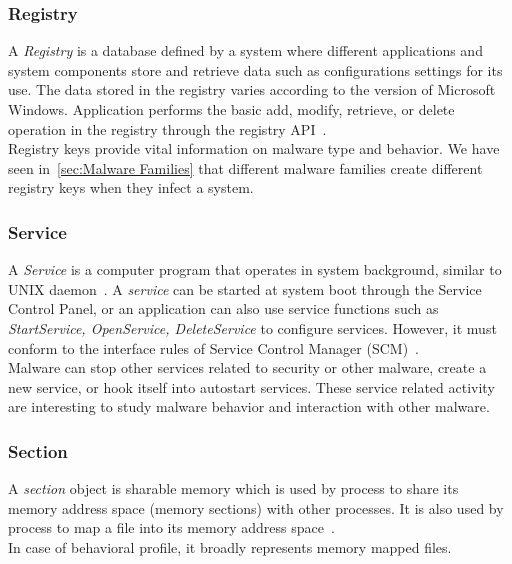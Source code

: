 \subsubsection{Registry}
\label{ssub:Registry}
A \emph{Registry} is a database defined by a system where different applications and system components store and retrieve data such as configurations settings for its use.
The data stored in the registry varies according to the version of Microsoft Windows.
Application performs the basic add, modify, retrieve, or delete operation in the registry through the registry API~\cite[]{msregistry}.\\
Registry keys provide vital information on malware type and behavior.
We have seen in~\autoref{sec:Malware Families} that different malware families create different registry keys when they infect a system.
\subsubsection{Service}
\label{ssub:Service}
A \emph{Service} is a computer program that operates in system background, similar to UNIX daemon~\cite[]{servicedef}.
A \emph{service} can be started at system boot through the Service Control Panel, or an application can also use service functions such as \emph{StartService, OpenService, DeleteService} to configure services.
However, it must conform to the interface rules of Service Control Manager (SCM)~\cite[]{msservice}.\\
Malware can stop other services related to security or other malware, create a new service, or hook itself into autostart services.
These service related activity are interesting to study malware behavior and interaction with other malware.
\subsubsection{Section}
\label{ssub:Section}
A \emph{section} object is sharable memory which is used by process to share its memory address space (memory sections) with other processes.
It is also used by process to map a file into its memory address space~\cite[]{mssection}.\\
In case of behavioral profile, it broadly represents memory mapped files.
